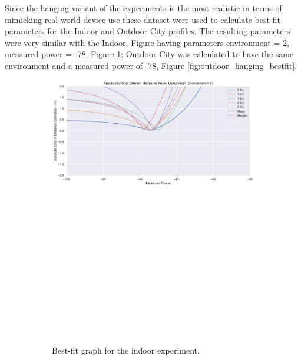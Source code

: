 \documentclass{l4proj}
\begin{document}
Since the hanging variant of the experiments is the most realistic in terms of mimicking real world device use these dataset were used to calculate best fit parameters for the Indoor and Outdoor City profiles. The resulting parameters were very similar with the Indoor, Figure  having parameters environment = 2, measured power = -78, Figure \ref{fig:indoor_hanging_bestfit}; Outdoor City was calculated to have the same environment and a measured power of -78, Figure \ref{fig:outdoor_hanging_bestfit}.

\begin{figure}[!htb]
    \centering
    \begin{subfigure}[b]{0.45\textwidth}
        \includegraphics[width=\textwidth]{images/indoor_hanging_bestfit.pdf}
        \caption{ Best-fit graph for the indoor experiment. }
        \label{fig:indoor_hanging_bestfit}
    \end{subfigure}
    ~
    \begin{subfigure}[b]{0.45\textwidth}

\end{subfigure}
\end{figure}
\end{document}
